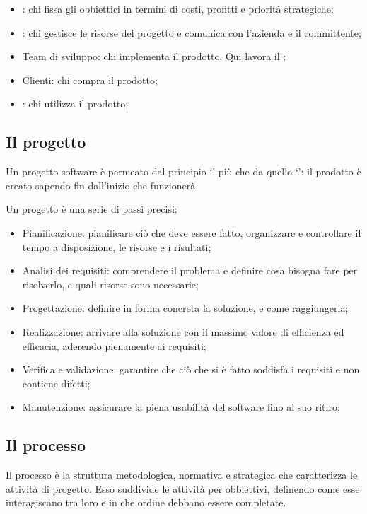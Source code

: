 \begin{itemize}
	\item {}: chi fissa gli obbiettici in termini di costi, profitti e priorità strategiche;
	\item {}: chi gestisce le risorse del progetto e comunica con l'azienda e il committente;
	\item Team di sviluppo: chi implementa il prodotto. Qui lavora il ;
	\item Clienti: chi compra il prodotto;
	\item {}: chi utilizza il prodotto;
\end{itemize}

\subsection{Il progetto}
Un progetto software è permeato dal principio `' più che da quello `': il prodotto è creato sapendo fin dall'inizio che funzionerà.

Un progetto è una serie di passi precisi:
\begin{itemize}
	\item Pianificazione: pianificare ciò che deve essere fatto, organizzare e controllare il tempo a disposizione, le risorse e i risultati;
	\item Analisi dei requisiti: comprendere il problema e definire cosa bisogna fare per risolverlo, e quali risorse sono necessarie;
	\item Progettazione: definire in forma concreta la soluzione, e come raggiungerla;
	\item Realizzazione: arrivare alla soluzione con il massimo valore di efficienza ed efficacia, aderendo pienamente ai requisiti;
	\item Verifica e validazione: garantire che ciò che si è fatto soddisfa i requisiti e non contiene difetti;
	\item Manutenzione: assicurare la piena usabilità del software fino al suo ritiro;
\end{itemize}

\subsection{Il processo}
Il processo è la struttura metodologica, normativa e strategica che caratterizza le attività di progetto. Esso suddivide le attività per obbiettivi, definendo come esse interagiscano tra loro e in che ordine debbano essere completate.